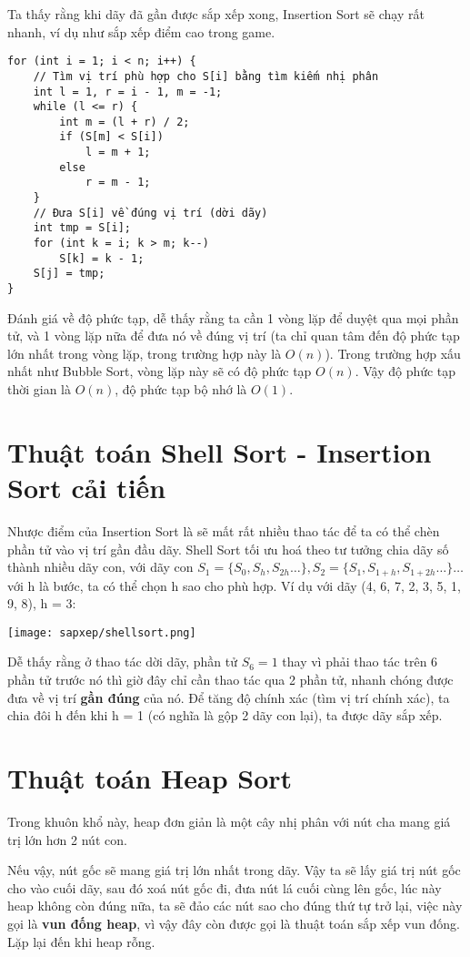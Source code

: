 Ta thấy rằng khi dãy đã gần được sắp xếp xong, Insertion Sort sẽ chạy rất nhanh, ví dụ như sắp xếp điểm cao trong game.

\begin{verbatim}
for (int i = 1; i < n; i++) {
    // Tìm vị trí phù hợp cho S[i] bằng tìm kiếm nhị phân
    int l = 1, r = i - 1, m = -1;
    while (l <= r) {
        int m = (l + r) / 2;
        if (S[m] < S[i])
            l = m + 1;
        else
            r = m - 1;
    }
    // Đưa S[i] về đúng vị trí (dời dãy)
    int tmp = S[i];
    for (int k = i; k > m; k--)
        S[k] = k - 1;
    S[j] = tmp;
}
\end{verbatim}

Đánh giá về độ phức tạp, dễ thấy rằng ta cần 1 vòng lặp để duyệt qua mọi phần tử, và 1 vòng lặp nữa để đưa nó về đúng vị trí (ta chỉ quan tâm đến độ phức tạp lớn nhất trong vòng lặp, trong trường hợp này là $O(n)$). Trong trường hợp xấu nhất như Bubble Sort, vòng lặp này sẽ có độ phức tạp $O(n)$. Vậy độ phức tạp thời gian là $O(n)$, độ phức tạp bộ nhớ là $O(1)$.

\section{Thuật toán Shell Sort - Insertion Sort cải tiến}
Nhược điểm của Insertion Sort là sẽ mất rất nhiều thao tác để ta có thể chèn phần tử vào vị trí gần đầu dãy. Shell Sort tối ưu hoá theo tư tưởng chia dãy số thành nhiều dãy con, với dãy con $S_1=\{S_0,S_{h},S_{2h}\dots\},S_2=\{S_1,S_{1+h},S_{1+2h}\dots\}\dots$ với h là bước, ta có thể chọn h sao cho phù hợp. Ví dụ với dãy (4, 6, 7, 2, 3, 5, 1, 9, 8), h = 3:

\texttt{[image: sapxep/shellsort.png]}

Dễ thấy rằng ở thao tác dời dãy, phần tử $S_6=1$ thay vì phải thao tác trên 6 phần tử trước nó thì giờ đây chỉ cần thao tác qua 2 phần tử, nhanh chóng được đưa về vị trí \textbf{gần đúng} của nó. Để tăng độ chính xác (tìm vị trí chính xác), ta chia đôi h đến khi h = 1 (có nghĩa là gộp 2 dãy con lại), ta được dãy sắp xếp.

\section{Thuật toán Heap Sort}
Trong khuôn khổ này, heap đơn giản là một cây nhị phân với nút cha mang giá trị lớn hơn 2 nút con.

Nếu vậy, nút gốc sẽ mang giá trị lớn nhất trong dãy. Vậy ta sẽ lấy giá trị nút gốc cho vào cuối dãy, sau đó xoá nút gốc đi, đưa nút lá cuối cùng lên gốc, lúc này heap không còn đúng nữa, ta sẽ đảo các nút sao cho đúng thứ tự trở lại, việc này gọi là \textbf{vun đống heap}, vì vậy đây còn được gọi là thuật toán sắp xếp vun đống. Lặp lại đến khi heap rỗng.

